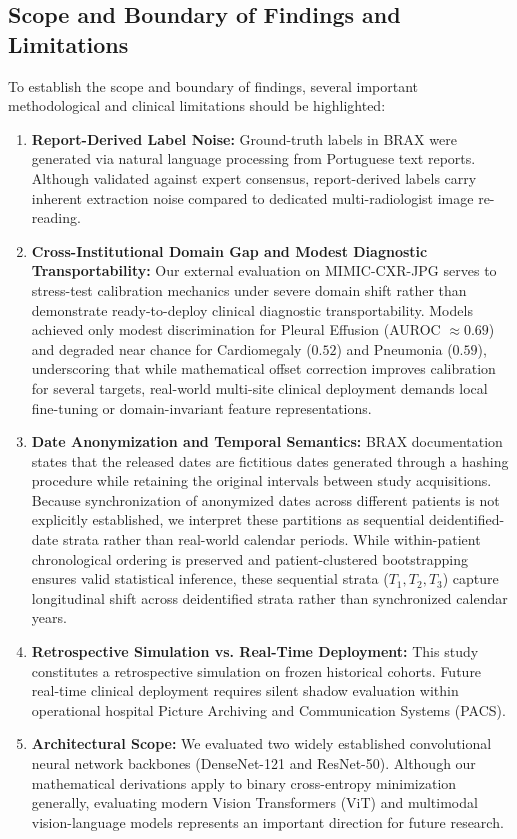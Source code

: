 \documentclass[preprint,12pt]{elsarticle}
\begin{document}
\subsection{Scope and Boundary of Findings and Limitations}
To establish the scope and boundary of findings, several important methodological and clinical limitations should be highlighted:
\begin{enumerate}
    \item \textbf{Report-Derived Label Noise:} Ground-truth labels in BRAX were generated via natural language processing from Portuguese text reports. Although validated against expert consensus, report-derived labels carry inherent extraction noise compared to dedicated multi-radiologist image re-reading.
    \item \textbf{Cross-Institutional Domain Gap and Modest Diagnostic Transportability:} Our external evaluation on MIMIC-CXR-JPG serves to stress-test calibration mechanics under severe domain shift rather than demonstrate ready-to-deploy clinical diagnostic transportability. Models achieved only modest discrimination for Pleural Effusion (AUROC $\approx 0.69$) and degraded near chance for Cardiomegaly ($0.52$) and Pneumonia ($0.59$), underscoring that while mathematical offset correction improves calibration for several targets, real-world multi-site clinical deployment demands local fine-tuning or domain-invariant feature representations.
    \item \textbf{Date Anonymization and Temporal Semantics:} BRAX documentation states that the released dates are fictitious dates generated through a hashing procedure while retaining the original intervals between study acquisitions. Because synchronization of anonymized dates across different patients is not explicitly established, we interpret these partitions as sequential deidentified-date strata rather than real-world calendar periods. While within-patient chronological ordering is preserved and patient-clustered bootstrapping ensures valid statistical inference, these sequential strata ($T_1, T_2, T_3$) capture longitudinal shift across deidentified strata rather than synchronized calendar years.
    \item \textbf{Retrospective Simulation vs. Real-Time Deployment:} This study constitutes a retrospective simulation on frozen historical cohorts. Future real-time clinical deployment requires silent shadow evaluation within operational hospital Picture Archiving and Communication Systems (PACS).
    \item \textbf{Architectural Scope:} We evaluated two widely established convolutional neural network backbones (DenseNet-121 and ResNet-50). Although our mathematical derivations apply to binary cross-entropy minimization generally, evaluating modern Vision Transformers (ViT) and multimodal vision-language models represents an important direction for future research.

\end{enumerate}
\end{document}
